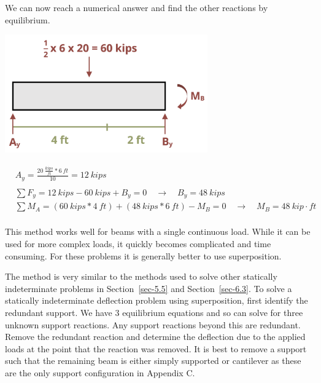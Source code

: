 \documentclass[
  letterpaper,
  DIV=11,
  numbers=noendperiod]{scrreprt}
\theoremstyle{definition}
\theoremstyle{remark}
\begin{document}
\begin{tcolorbox}
\begin{tcolorbox}
We can now reach a numerical answer and find the other reactions by
equilibrium.

\begin{center}
\includegraphics[width=3.4375in,height=\textheight]{images/CH11 PNGs/example11.6-4.png}
\end{center}

\[
\begin{aligned}
&A_y=\frac{20~\frac{kips}{ft}*6{~ft}}{10}=12{~kips} \\
\\
& \sum F_y=12{~kips}-60{~kips}+B_y=0 \quad \rightarrow \quad B_y=48{~kips} \\
& \sum M_A=(60{~kips}* 4{~ft})+(48{~kips}*6{~ft})-M_B=0 \quad \rightarrow \quad M_B=48{~kip}\cdot{ft} \\ & \end{aligned}
\]

\end{tcolorbox}

\end{tcolorbox}

This method works well for beams with a single continuous load. While it
can be used for more complex loads, it quickly becomes complicated and
time consuming. For these problems it is generally better to use
superposition.

The method is very similar to the methods used to solve other statically
indeterminate problems in Section~\ref{sec-5.5} and
Section~\ref{sec-6.3}. To solve a statically indeterminate deflection
problem using superposition, first identify the redundant support. We
have 3 equilibrium equations and so can solve for three unknown support
reactions. Any support reactions beyond this are redundant. Remove the
redundant reaction and determine the deflection due to the applied loads
at the point that the reaction was removed. It is best to remove a
support such that the remaining beam is either simply supported or
cantilever as these are the only support configuration in Appendix C.
\end{document}
